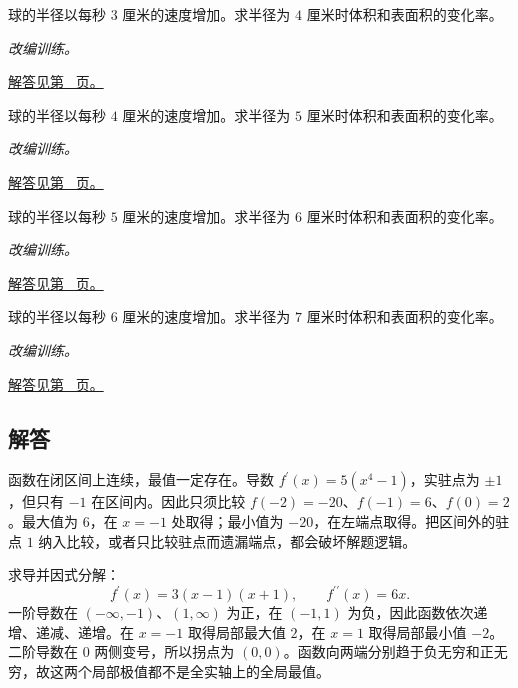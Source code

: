 \documentclass[UTF8,12pt,a4paper,fontset=fandol]{ctexart}
\begin{document}
\begin{example}[相关变化率中的链式法则]\label{ex:c11q22}
球的半径以每秒 $3$ 厘米的速度增加。求半径为 $4$ 厘米时体积和表面积的变化率。
\par\textit{改编训练。}\par\hyperref[ans:c11q22]{解答见第~\pageref{ans:c11q22} 页。}
\end{example}
\begin{example}[相关变化率中的链式法则]\label{ex:c11q23}
球的半径以每秒 $4$ 厘米的速度增加。求半径为 $5$ 厘米时体积和表面积的变化率。
\par\textit{改编训练。}\par\hyperref[ans:c11q23]{解答见第~\pageref{ans:c11q23} 页。}
\end{example}
\begin{example}[相关变化率中的链式法则]\label{ex:c11q24}
球的半径以每秒 $5$ 厘米的速度增加。求半径为 $6$ 厘米时体积和表面积的变化率。
\par\textit{改编训练。}\par\hyperref[ans:c11q24]{解答见第~\pageref{ans:c11q24} 页。}
\end{example}
\begin{example}[相关变化率中的链式法则]\label{ex:c11q25}
球的半径以每秒 $6$ 厘米的速度增加。求半径为 $7$ 厘米时体积和表面积的变化率。
\par\textit{改编训练。}\par\hyperref[ans:c11q25]{解答见第~\pageref{ans:c11q25} 页。}
\end{example}
\subsection{解答}
\begin{solve}\label{ans:c11q1}
函数在闭区间上连续，最值一定存在。导数 $f^{\prime}(x)=5(x^4-1)$，实驻点为 $\pm1$，但只有 $-1$ 在区间内。因此只须比较 $f(-2)=-20$、$f(-1)=6$、$f(0)=2$。最大值为 $6$，在 $x=-1$ 处取得；最小值为 $-20$，在左端点取得。把区间外的驻点 $1$ 纳入比较，或者只比较驻点而遗漏端点，都会破坏解题逻辑。
\end{solve}

\begin{solve}\label{ans:c11q2}
求导并因式分解：
\[
f^{\prime}(x)=3(x-1)(x+1),\qquad f^{\prime\prime}(x)=6x.
\]
一阶导数在 $(-\infty,-1)$、$(1,\infty)$ 为正，在 $(-1,1)$ 为负，因此函数依次递增、递减、递增。在 $x=-1$ 取得局部最大值 $2$，在 $x=1$ 取得局部最小值 $-2$。二阶导数在 $0$ 两侧变号，所以拐点为 $(0,0)$。函数向两端分别趋于负无穷和正无穷，故这两个局部极值都不是全实轴上的全局最值。
\end{solve}
\end{document}
